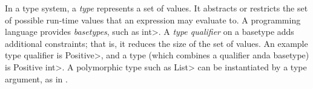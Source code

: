 % 
% 
% 
% 





In a type system,
a \textit{type} represents a set of values.  It abstracts or restricts the
set of possible run-time values that an expression may evaluate to.
A programming language provides \emph{basetypes}, such as \<int>.
A \textit{type qualifier} on a basetype adds additional constraints;
that is, it reduces the size of the set of values.
An example type qualifier is \<Positive>, and a type (which combines a qualifier
anda basetype) is \<Positive int>.
A polymorphic type such as \<List> can be instantiated by a type argument,
as in .

